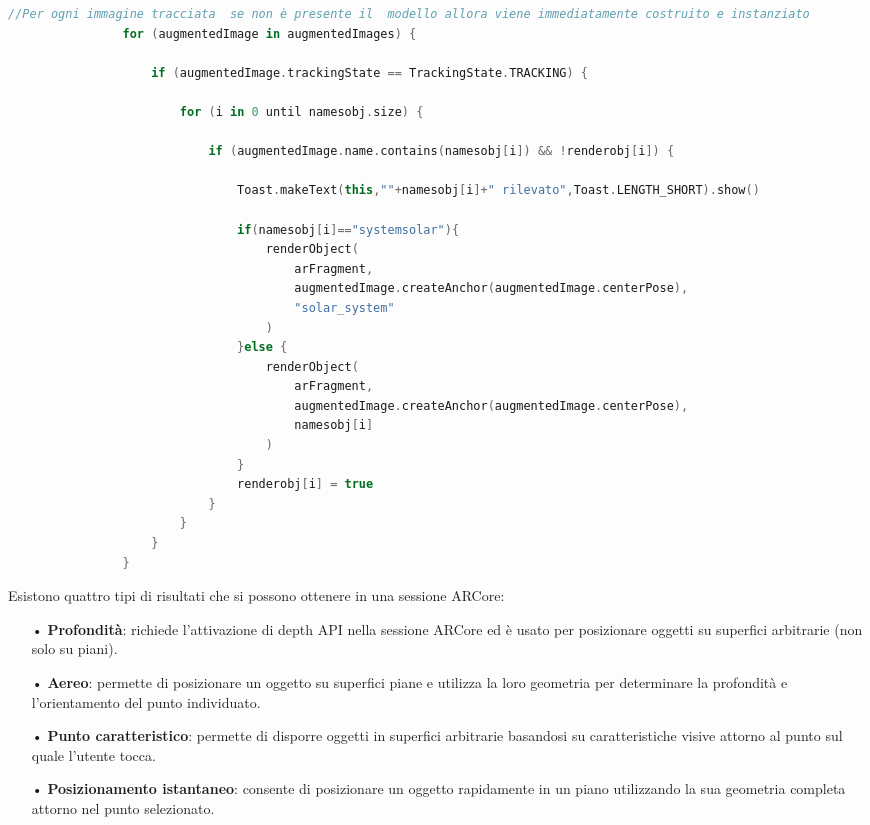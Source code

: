 \documentclass[crop=false, class=book]{standalone}
\begin{document}
	\begin{center}
			\begin{minipage}{1.1\textwidth}
				\begin{lstlisting}[caption={Definizione Anchor in Augmented Images}, label={lst:Definizione Anchor in Augmented Images}, 	language=Kotlin]
				//Per ogni immagine tracciata  se non è presente il  modello allora viene immediatamente costruito e instanziato
        		for (augmentedImage in augmentedImages) {

            		if (augmentedImage.trackingState == TrackingState.TRACKING) {

                		for (i in 0 until namesobj.size) {

                    		if (augmentedImage.name.contains(namesobj[i]) && !renderobj[i]) {

                        		Toast.makeText(this,""+namesobj[i]+" rilevato",Toast.LENGTH_SHORT).show()

                        		if(namesobj[i]=="systemsolar"){
                            		renderObject(
                                		arFragment,
                                		augmentedImage.createAnchor(augmentedImage.centerPose),
                                		"solar_system"
                            		)
                        		}else {
                            		renderObject(
                                		arFragment,
                                		augmentedImage.createAnchor(augmentedImage.centerPose),
                                		namesobj[i]
                            		)
                        		}	
                        		renderobj[i] = true
                    		}
                		}
            		}
        		}
				\end{lstlisting}
		\end{minipage}
	\end{center}
		
		Esistono quattro tipi di risultati che si possono ottenere in una sessione ARCore:
		\begin{itemize}
		\item[•] \textbf{Profondità}: richiede l'attivazione di depth API nella sessione ARCore ed è usato per posizionare oggetti su superfici arbitrarie (non solo su piani).
		\item[•]\textbf{Aereo}: permette di posizionare un oggetto su superfici piane e utilizza la loro geometria per determinare la profondità e l'orientamento del punto individuato.
		\item[•] \textbf{Punto caratteristico}: permette di disporre oggetti in superfici arbitrarie basandosi su caratteristiche visive attorno al punto sul quale l'utente tocca. 
		\item[•] \textbf{Posizionamento istantaneo}: consente di posizionare un oggetto rapidamente in un piano utilizzando la sua geometria completa attorno nel punto selezionato. 
	\end{itemize}
	
\end{document}
